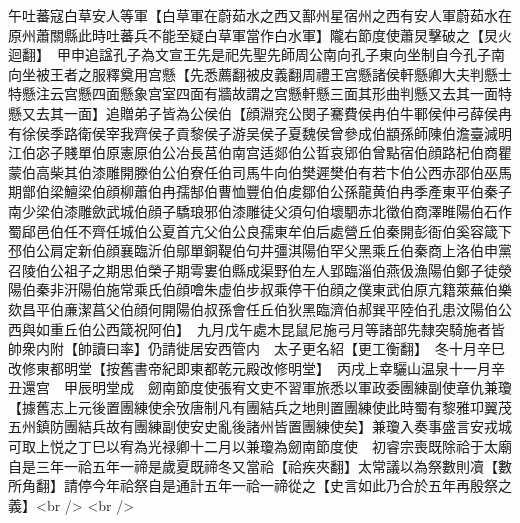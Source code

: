 午吐蕃寇白草安人等軍【白草軍在蔚茹水之西又鄯州星宿州之西有安人軍蔚茹水在原州蕭關縣此時吐蕃兵不能至疑白草軍當作白水軍】隴右節度使蕭炅擊破之【炅火迴翻】　甲申追諡孔子為文宣王先是祀先聖先師周公南向孔子東向坐制自今孔子南向坐被王者之服釋奠用宫懸【先悉薦翻被皮義翻周禮王宫懸諸侯軒懸卿大夫判懸士特懸注云宫懸四面懸象宫室四面有牆故謂之宫懸軒懸三面其形曲判懸又去其一面特懸又去其一面】追贈弟子皆為公侯伯【顔淵兖公閔子騫費侯冉伯牛鄆侯仲弓薛侯冉有徐侯季路衛侯宰我齊侯子貢黎侯子游吴侯子夏魏侯曾參成伯顓孫師陳伯澹臺減明江伯宓子賤單伯原憲原伯公冶長莒伯南宫适郯伯公晢哀郳伯曾點宿伯顔路杞伯商瞿蒙伯高柴其伯漆雕開滕伯公伯寮任伯司馬牛向伯樊遲樊伯有若卞伯公西赤邵伯巫馬期鄫伯梁鱣梁伯顔柳蕭伯冉孺郜伯曹恤豐伯伯䖍鄒伯公孫龍黄伯冉季產東平伯秦子南少梁伯漆雕歛武城伯顔子驕琅邪伯漆雕徒父須句伯壞駟赤北徵伯商澤睢陽伯石作蜀郈邑伯任不齊任城伯公夏首亢父伯公良孺東牟伯后處營丘伯秦開彭衙伯奚容箴下邳伯公肩定新伯顔襄臨沂伯鄔單銅鞮伯句井彊淇陽伯罕父黑乘丘伯秦商上洛伯申黨召陵伯公祖子之期思伯榮子期雩婁伯縣成渠野伯左人郢臨淄伯燕伋漁陽伯鄭子徒滎陽伯秦非汧陽伯施常乘氏伯顔噲朱虚伯步叔乘停干伯顔之僕東武伯原亢籍萊蕪伯樂欬昌平伯亷潔菖父伯顔何開陽伯叔孫會任丘伯狄黑臨濟伯郝巽平陸伯孔患汶陽伯公西與如重丘伯公西箴祝阿伯】　九月戊午處木昆鼠尼施弓月等諸部先隸突騎施者皆帥衆内附【帥讀曰率】仍請徙居安西管内　太子更名紹【更工衡翻】　冬十月辛巳改修東都明堂【按舊書帝紀即東都乾元殿改修明堂】　丙戌上幸驪山温泉十一月辛丑還宫　甲辰明堂成　劒南節度使張宥文吏不習軍旅悉以軍政委團練副使章仇兼瓊【據舊志上元後置團練使余攷唐制凡有團結兵之地則置團練使此時蜀有黎雅卭翼茂五州鎮防團結兵故有團練副使安史亂後諸州皆置團練使矣】兼瓊入奏事盛言安戎城可取上悦之丁巳以宥為光禄卿十二月以兼瓊為劒南節度使　初睿宗喪既除祫于太廟自是三年一祫五年一禘是歲夏既禘冬又當祫【祫疾夾翻】太常議以為祭數則凟【數所角翻】請停今年祫祭自是通計五年一祫一禘從之【史言如此乃合於五年再殷祭之義】<br />
<br />
